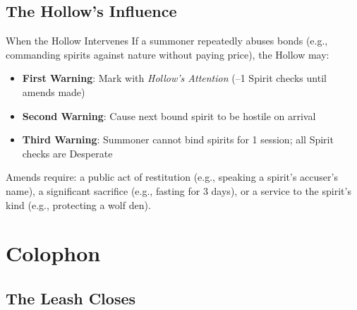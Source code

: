 \documentclass[11pt,twoside]{book}
\begin{document}
\chapter{The Hollow's Influence}
\begin{mechbox}{When the Hollow Intervenes}
  If a summoner repeatedly abuses bonds (e.g., commanding spirits against nature without paying price), the Hollow may:
  \begin{itemize}
    \item \textbf{First Warning}: Mark with \textit{Hollow's Attention} (--1 Spirit checks until amends made)
    \item \textbf{Second Warning}: Cause next bound spirit to be hostile on arrival
    \item \textbf{Third Warning}: Summoner cannot bind spirits for 1 session; all Spirit checks are Desperate
  \end{itemize}
  Amends require: a public act of restitution (e.g., speaking a spirit's accuser's name), a significant sacrifice (e.g., fasting for 3 days), or a service to the spirit's kind (e.g., protecting a wolf den).
\end{mechbox}


\part{Colophon}

\chapter{The Leash Closes}

\vspace*{2cm}
\end{document}
